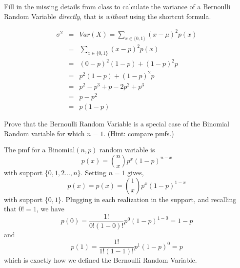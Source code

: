 \documentclass[addpoints,12pt]{exam}
\begin{document}
\begin{questions}
\question 
	
	\question Fill in the missing details from class to calculate the variance of a Bernoulli Random Variable \emph{directly}, that is \emph{without} using the shortcut formula.
	\begin{solution} 
	\begin{eqnarray*}
	\sigma^2 &=& Var(X) = \sum_{x \in \{0,1\}} (x - \mu)^2 p(x)\\ 
	&=& \sum_{x \in \{0,1\}} (x - p)^2 p(x)\\
	 &=& (0 - p)^2 (1-p) + (1-p)^2 p \\
	 &=& p^2(1-p) + (1-p)^2 p\\ 
	 &=& p^2 - p^3 + p - 2p^2 +p^3 \\
	 &=& p - p^2\\ 
	 &=&p(1-p)
\end{eqnarray*}
	\end{solution}

\question Prove that the Bernoulli Random Variable is a special case of the Binomial Random variable for which $n = 1$.	 (Hint: compare pmfs.)
	\begin{solution}
		The pmf for a Binomial$(n,p)$ random variable is
		$$p(x) = {n \choose x} p^x (1-p)^{n-x}$$
		with support $\{0, 1, 2\hdots, n\}$. Setting $n=1$ gives,
		$$p(x) = p(x) = {1 \choose x} p^x (1-p)^{1-x}$$
		with support $\{0,1\}$. Plugging in each realization in the support, and recalling that $0! = 1$, we have
			$$p(0) = \frac{1!}{0!(1-0)!} p^0 (1-p)^{1-0} = 1 - p$$
		and
		$$p(1) = \frac{1!}{1!(1-1)!} p^1 (1-p)^0 = p$$
		which is exactly how we defined the Bernoulli Random Variable.
	\end{solution}
	

\end{questions}
\end{document}
